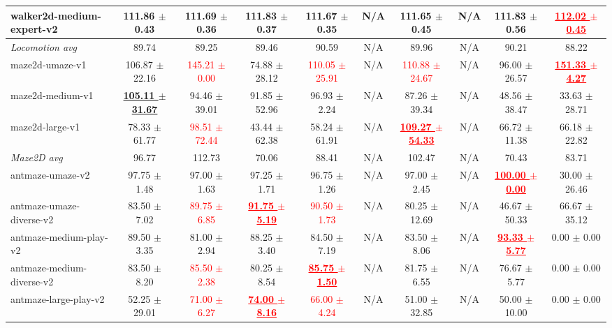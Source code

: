 \documentclass[a4paper]{article}
\begin{document}
\begin{table}[t]
{\begin{tabular}{lccccccccc}
    walker2d-medium-expert-v2 & 111.86 $\pm$ 0.43 & 111.69 $\pm$ 0.36 & 111.83 $\pm$ 0.37 & 111.67 $\pm$ 0.35 & N/A & 111.65 $\pm$ 0.45 & N/A & 111.83 $\pm$ 0.56 & \textcolor{red}{\textbf{\underline{112.02 $\pm$ 0.45}}} \\
    \midrule
    \textit{Locomotion avg} & 89.74 & 89.25 & 89.46 & 90.59 & N/A & 89.96 & N/A & 90.21 & 88.22 \\
    \midrule
    maze2d-umaze-v1 & 106.87 $\pm$ 22.16 & \textcolor{red}{145.21 $\pm$ 0.00} & 74.88 $\pm$ 28.12 & \textcolor{red}{110.05 $\pm$ 25.91} & N/A & \textcolor{red}{110.88 $\pm$ 24.67} & N/A & 96.00 $\pm$ 26.57 & \textcolor{red}{\textbf{\underline{151.33 $\pm$ 4.27}}} \\
    maze2d-medium-v1 & \textbf{\underline{105.11 $\pm$ 31.67}} & 94.46 $\pm$ 39.01 & 91.85 $\pm$ 52.96 & 96.93 $\pm$ 2.24 & N/A & 87.26 $\pm$ 39.34 & N/A & 48.56 $\pm$ 38.47 & 33.63 $\pm$ 28.71 \\
    maze2d-large-v1 & 78.33 $\pm$ 61.77 & \textcolor{red}{98.51 $\pm$ 72.44} & 43.44 $\pm$ 62.38 & 58.24 $\pm$ 61.91 & N/A & \textcolor{red}{\textbf{\underline{109.27 $\pm$ 54.33}}} & N/A & 66.72 $\pm$ 11.38 & 66.18 $\pm$ 22.82 \\
    \midrule
    \textit{Maze2D avg} & 96.77 & 112.73 & 70.06 & 88.41 & N/A & 102.47 & N/A & 70.43 & 83.71 \\
    \midrule
    antmaze-umaze-v2 & 97.75 $\pm$ 1.48 & 97.00 $\pm$ 1.63 & 97.25 $\pm$ 1.71 & 96.75 $\pm$ 1.26 & N/A & 97.00 $\pm$ 2.45 & N/A & \textcolor{red}{\textbf{\underline{100.00 $\pm$ 0.00}}} & 30.00 $\pm$ 26.46 \\
    antmaze-umaze-diverse-v2 & 83.50 $\pm$ 7.02 & \textcolor{red}{89.75 $\pm$ 6.85} & \textcolor{red}{\textbf{\underline{91.75 $\pm$ 5.19}}} & \textcolor{red}{90.50 $\pm$ 1.73} & N/A & 80.25 $\pm$ 12.69 & N/A & 46.67 $\pm$ 50.33 & 66.67 $\pm$ 35.12 \\
    antmaze-medium-play-v2 & 89.50 $\pm$ 3.35 & 81.00 $\pm$ 2.94 & 88.25 $\pm$ 3.40 & 84.50 $\pm$ 7.19 & N/A & 83.50 $\pm$ 8.06 & N/A & \textcolor{red}{\textbf{\underline{93.33 $\pm$ 5.77}}} & 0.00 $\pm$ 0.00 \\
    antmaze-medium-diverse-v2 & 83.50 $\pm$ 8.20 & \textcolor{red}{85.50 $\pm$ 2.38} & 80.25 $\pm$ 8.54 & \textcolor{red}{\textbf{\underline{85.75 $\pm$ 1.50}}} & N/A & 81.75 $\pm$ 6.55 & N/A & 76.67 $\pm$ 5.77 & 0.00 $\pm$ 0.00 \\
    antmaze-large-play-v2 & 52.25 $\pm$ 29.01 & \textcolor{red}{71.00 $\pm$ 6.27} & \textcolor{red}{\textbf{\underline{74.00 $\pm$ 8.16}}} & \textcolor{red}{66.00 $\pm$ 4.24} & N/A & 51.00 $\pm$ 32.85 & N/A & 50.00 $\pm$ 10.00 & 0.00 $\pm$ 0.00 \\

\end{tabular}}
\end{table}
\end{document}
